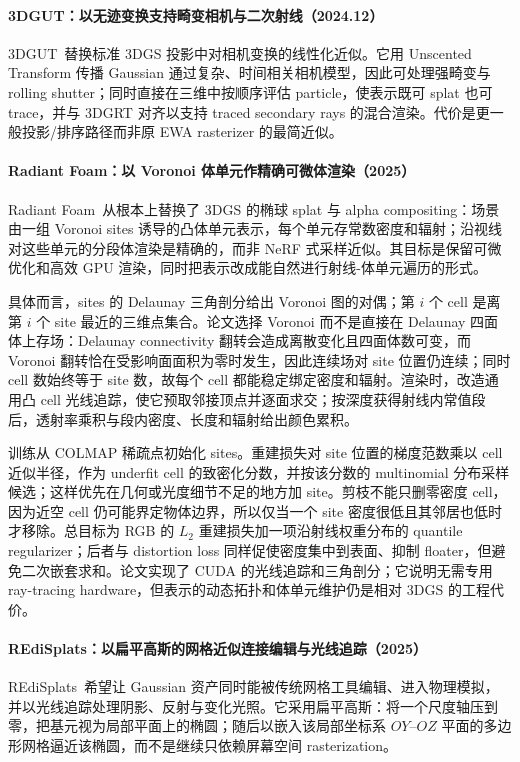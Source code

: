 \paragraph{3DGUT：以无迹变换支持畸变相机与二次射线（2024.12）}
3DGUT~\cite{2412_12507}替换标准 3DGS 投影中对相机变换的线性化近似。它用 Unscented Transform 传播 Gaussian 通过复杂、时间相关相机模型，因此可处理强畸变与 rolling shutter；同时直接在三维中按顺序评估 particle，使表示既可 splat 也可 trace，并与 3DGRT 对齐以支持 traced secondary rays 的混合渲染。代价是更一般投影/排序路径而非原 EWA rasterizer 的最简近似。


\paragraph{Radiant Foam：以 Voronoi 体单元作精确可微体渲染（2025）\cite{2502_01157}}
Radiant Foam~\cite{2502_01157}从根本上替换了 3DGS 的椭球 splat 与 alpha compositing：场景由一组 Voronoi sites 诱导的凸体单元表示，每个单元存常数密度和辐射；沿视线对这些单元的分段体渲染是精确的，而非 NeRF 式采样近似。其目标是保留可微优化和高效 GPU 渲染，同时把表示改成能自然进行射线-体单元遍历的形式。

具体而言，sites 的 Delaunay 三角剖分给出 Voronoi 图的对偶；第 $i$ 个 cell 是离第 $i$ 个 site 最近的三维点集合。论文选择 Voronoi 而不是直接在 Delaunay 四面体上存场：Delaunay connectivity 翻转会造成离散变化且四面体数可变，而 Voronoi 翻转恰在受影响面面积为零时发生，因此连续场对 site 位置仍连续；同时 cell 数始终等于 site 数，故每个 cell 都能稳定绑定密度和辐射。渲染时，改造通用凸 cell 光线追踪，使它预取邻接顶点并逐面求交；按深度获得射线内常值段后，透射率乘积与段内密度、长度和辐射给出颜色累积。

训练从 COLMAP 稀疏点初始化 sites。重建损失对 site 位置的梯度范数乘以 cell 近似半径，作为 underfit cell 的致密化分数，并按该分数的 multinomial 分布采样候选；这样优先在几何或光度细节不足的地方加 site。剪枝不能只删零密度 cell，因为近空 cell 仍可能界定物体边界，所以仅当一个 site 密度很低且其邻居也低时才移除。总目标为 RGB 的 $L_2$ 重建损失加一项沿射线权重分布的 quantile regularizer；后者与 distortion loss 同样促使密度集中到表面、抑制 floater，但避免二次嵌套求和。论文实现了 CUDA 的光线追踪和三角剖分；它说明无需专用 ray-tracing hardware，但表示的动态拓扑和体单元维护仍是相对 3DGS 的工程代价。

\paragraph{REdiSplats：以扁平高斯的网格近似连接编辑与光线追踪（2025）\cite{2503_12284}}
REdiSplats~\cite{2503_12284}希望让 Gaussian 资产同时能被传统网格工具编辑、进入物理模拟，并以光线追踪处理阴影、反射与变化光照。它采用扁平高斯：将一个尺度轴压到零，把基元视为局部平面上的椭圆；随后以嵌入该局部坐标系 $OY$--$OZ$ 平面的多边形网格逼近该椭圆，而不是继续只依赖屏幕空间 rasterization。

